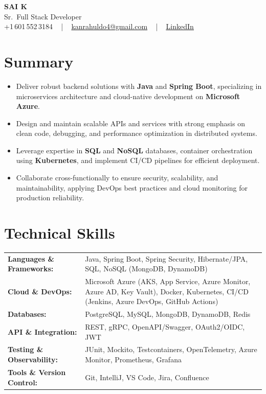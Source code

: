\documentclass[letterpaper,11pt]{article}
\newcommand{\resumeItem}[1]{
  \item\footnotesize{
    {#1 \vspace{-2pt}}
  }
}
\newcommand{\resumeItemListStart}{\begin{itemize}[leftmargin=*]}
\newcommand{\resumeItemListEnd}{\end{itemize}\vspace{-5pt}}
\begin{document}
\begin{center}
    {\fontsize{14pt}{12pt}\selectfont \textbf{\MakeUppercase{Sai K}}}\\ \vspace{2pt}
    \fontsize{10pt}{12pt}\selectfont Sr.\ Full Stack Developer\\ \vspace{2pt}
    \fontsize{10pt}{12pt}\selectfont +1\,601\,552\,3184 ~ | ~
    \href{mailto:kanrahuldo4@gmail.com}{kanrahuldo4@gmail.com} ~ | ~
    \href{https://www.linkedin.com/in/srrrk/}{\color{blue}\underline{LinkedIn}}
    \vspace{-10pt}
\end{center}

\section{Summary}
\fontsize{9pt}{10pt}\selectfont
\resumeItemListStart
  \resumeItem{Deliver robust backend solutions with \textbf{Java} and \textbf{Spring Boot}, specializing in microservices architecture and cloud-native development on \textbf{Microsoft Azure}.}
  \resumeItem{Design and maintain scalable APIs and services with strong emphasis on clean code, debugging, and performance optimization in distributed systems.}
  \resumeItem{Leverage expertise in \textbf{SQL} and \textbf{NoSQL} databases, container orchestration using \textbf{Kubernetes}, and implement CI/CD pipelines for efficient deployment.}
  \resumeItem{Collaborate cross-functionally to ensure security, scalability, and maintainability, applying DevOps best practices and cloud monitoring for production reliability.}
\resumeItemListEnd
\vspace{-6pt}

\section{Technical Skills}
\vspace{-14pt}
\begin{table}[h]
\fontsize{9pt}{10pt}\selectfont
\begin{tabular}{p{0.3\linewidth} p{0.7\linewidth}}
\textbf{Languages \& Frameworks:} & Java, Spring Boot, Spring Security, Hibernate/JPA, SQL, NoSQL (MongoDB, DynamoDB) \\
\textbf{Cloud \& DevOps:} & Microsoft Azure (AKS, App Service, Azure Monitor, Azure AD, Key Vault), Docker, Kubernetes, CI/CD (Jenkins, Azure DevOps, GitHub Actions) \\
\textbf{Databases:} & PostgreSQL, MySQL, MongoDB, DynamoDB, Redis \\
\textbf{API \& Integration:} & REST, gRPC, OpenAPI/Swagger, OAuth2/OIDC, JWT \\
\textbf{Testing \& Observability:} & JUnit, Mockito, Testcontainers, OpenTelemetry, Azure Monitor, Prometheus, Grafana \\
\textbf{Tools \& Version Control:} & Git, IntelliJ, VS Code, Jira, Confluence \\
\end{tabular}
\end{table}
\vspace{-15pt}
\end{document}
